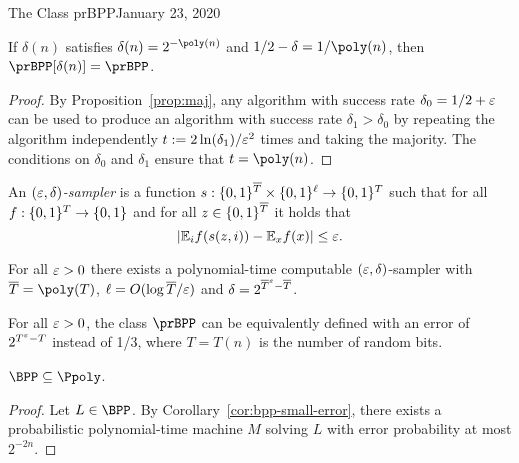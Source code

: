 \begin{lecture}{1}{The Class prBPP}{January 23, 2020}
\begin{corollary}\label{cor:bpp-small-error}
  If $\delta(n)$ satisfies $\delta(n) = 2^{-\poly(n)}$ and $1/2 - \delta =
  1/\poly(n)$, then $\prBPP[\delta(n)] = \prBPP$.
\end{corollary}

\begin{proof}
  By Proposition~\ref{prop:maj}, any algorithm with success rate $\delta_0 =
  1/2 + \varepsilon$ can be used to produce an algorithm with success rate $\delta_1 >
  \delta_0$ by repeating the algorithm independently $t :=
  2\ln(\delta_1)/\varepsilon^2$ times and taking the majority. The conditions on
  $\delta_0$ and $\delta_1$ ensure that $t = \poly(n)$.
\end{proof}


\begin{definition}
  An \emph{$(\varepsilon, \delta)$-sampler} is a function $s :
  \{0,1\}^{\overline{T}} \times \{0,1\}^\ell \to \{0,1\}^T$ such that for
  all $f : \{0,1\}^T \to \{0,1\}$ and for all $z \in
  \{0,1\}^{\overline{T}}$ it holds that \[
    |\mathbb{E}_i f(s(z, i)) - \mathbb{E}_x f(x)| \le \varepsilon.
  \]
\end{definition}

\begin{theorem}
  For all $\varepsilon > 0$ there exists a polynomial-time computable $(\varepsilon,
  \delta)$-sampler with $\overline{T} = \poly(T)$, $\ell = O(\log
  \overline{T}/\varepsilon)$ and $\delta = 2^{\overline{T}^\varepsilon - \overline{T}}$.
\end{theorem}

\begin{corollary}\label{cor:bpp-small-random}
  For all $\varepsilon > 0$, the class $\prBPP$ can be equivalently defined with an
  error of $2^{T^\varepsilon - T}$ instead of 1/3, where $T = T(n)$ is the number of
  random bits.
\end{corollary}


\begin{corollary}
  $\BPP \subseteq \Ppoly$.
\end{corollary}

\begin{proof}
    Let $L \in \BPP$. By Corollary~\ref{cor:bpp-small-error}, there exists a
    probabilistic polynomial-time machine $M$ solving $L$ with error
    probability at most $2^{-2n}$.


\end{proof}
\end{lecture}
